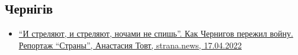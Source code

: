  
 
 
 
 

\subsection{Чернігів}
\label{sec:topics.vojna.chernigov}

\begin{itemize} %

\item \hyperlink{17_04_2022.stz.news.ua.strana.1.chernigov}{
\enquote{И стреляют, и стреляют, ночами не спишь}. Как Чернигов пережил войну. Репортаж \enquote{Страны}, 
Анастасия Товт, strana.news, 17.04.2022
}

\end{itemize} %
